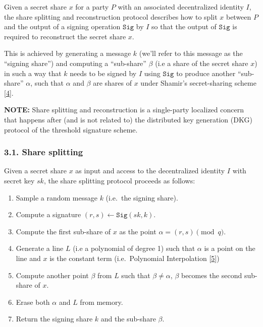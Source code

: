 \documentclass[
]{article}
\providecommand{\tightlist}{%
  \setlength{\itemsep}{0pt}\setlength{\parskip}{0pt}}
\begin{document}
Given a secret share \(x\) for a party \(P\) with an associated
decentralized identity \(I\), the share splitting and reconstruction
protocol describes how to split \(x\) between \(P\) and the output of a
signing operation \(\mathtt{Sig}\) by \(I\) so that the output of
\(\mathtt{Sig}\) is required to reconstruct the secret share \(x\).

This is achieved by generating a message \(k\) (we'll refer to this
message as the ``signing share'') and computing a ``sub-share''
\(\beta\) (i.e a share of the secret share \(x\)) in such a way that
\(k\) needs to be signed by \(I\) using \(\mathtt{Sig}\) to produce
another ``sub-share'' \(\alpha\), such that \(\alpha\) and \(\beta\) are
shares of \(x\) under Shamir's secret-sharing scheme
{[}\protect\hyperlink{ref-sss79}{4}{]}.

\textbf{NOTE:} Share splitting and reconstruction is a single-party
localized concern that happens after (and is not related to) the
distributed key generation (DKG) protocol of the threshold signature
scheme.

\hypertarget{share-splitting}{%
\subsubsection{3.1. Share splitting}\label{share-splitting}}

Given a secret share \(x\) as input and access to the decentralized
identity \(I\) with secret key \(sk\), the share splitting protocol
proceeds as follows:

\begin{enumerate}
\def\labelenumi{\arabic{enumi}.}
\tightlist
\item
  Sample a random message \(k\) (i.e.~the signing share).
\item
  Compute a signature \((r, s) \leftarrow \mathtt{Sig}(sk, k)\).
\item
  Compute the first sub-share of \(x\) as the point
  \(\alpha = (r, s) \pmod q\).
\item
  Generate a line \(L\) (i.e a polynomial of degree 1) such that
  \(\alpha\) is a point on the line and \(x\) is the constant term
  (i.e.~Polynomial Interpolation
  {[}\protect\hyperlink{ref-wiki:interpolation}{5}{]})
\item
  Compute another point \(\beta\) from \(L\) such that
  \(\beta \neq \alpha\), \(\beta\) becomes the second sub-share of
  \(x\).
\item
  Erase both \(\alpha\) and \(L\) from memory.
\item
  Return the signing share \(k\) and the sub-share \(\beta\).
\end{enumerate}
\end{document}
